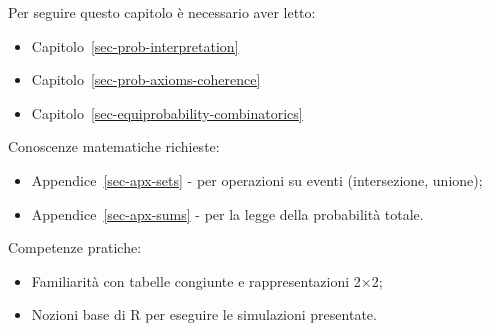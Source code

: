 \documentclass[
  italian,
  letterpaper,
  a4paper,
  11pt,
  open=any]{scrbook}
\providecommand{\tightlist}{%
  \setlength{\itemsep}{0pt}\setlength{\parskip}{0pt}}
\theoremstyle{plain}
\theoremstyle{definition}
\theoremstyle{definition}
\theoremstyle{remark}
\begin{document}
\begin{tcolorbox}[enhanced jigsaw, arc=.35mm, bottomrule=.15mm, bottomtitle=1mm, breakable, colback=white, colbacktitle=quarto-callout-tip-color!10!white, colframe=quarto-callout-tip-color-frame, coltitle=black, left=2mm, leftrule=.75mm, opacityback=0, opacitybacktitle=0.6, rightrule=.15mm, title=\textcolor{quarto-callout-tip-color}{\faLightbulb}\hspace{0.5em}{Prerequisiti}, titlerule=0mm, toprule=.15mm, toptitle=1mm]

Per seguire questo capitolo è necessario aver letto:

\begin{itemize}
\tightlist
\item
  Capitolo~\ref{sec-prob-interpretation}
\item
  Capitolo~\ref{sec-prob-axioms-coherence}
\item
  Capitolo~\ref{sec-equiprobability-combinatorics}
\end{itemize}

Conoscenze matematiche richieste:

\begin{itemize}
\tightlist
\item
  Appendice~\ref{sec-apx-sets} - per operazioni su eventi (intersezione,
  unione);
\item
  Appendice~\ref{sec-apx-sums} - per la legge della probabilità totale.
\end{itemize}

Competenze pratiche:

\begin{itemize}
\tightlist
\item
  Familiarità con tabelle congiunte e rappresentazioni 2×2;
\item
  Nozioni base di R per eseguire le simulazioni presentate.
\end{itemize}

\end{tcolorbox}
\end{document}
